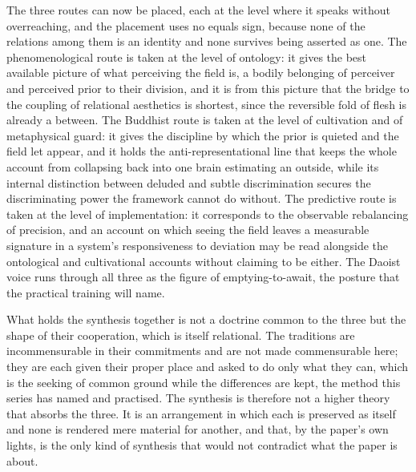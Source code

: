 The three routes can now be placed, each at the level where it speaks without overreaching, and the placement uses no equals sign, because none of the relations among them is an identity and none survives being asserted as one. The phenomenological route is taken at the level of ontology: it gives the best available picture of what perceiving the field is, a bodily belonging of perceiver and perceived prior to their division, and it is from this picture that the bridge to the coupling of relational aesthetics is shortest, since the reversible fold of flesh is already a between. The Buddhist route is taken at the level of cultivation and of metaphysical guard: it gives the discipline by which the prior is quieted and the field let appear, and it holds the anti-representational line that keeps the whole account from collapsing back into one brain estimating an outside, while its internal distinction between deluded and subtle discrimination secures the discriminating power the framework cannot do without. The predictive route is taken at the level of implementation: it corresponds to the observable rebalancing of precision, and an account on which seeing the field leaves a measurable signature in a system's responsiveness to deviation may be read alongside the ontological and cultivational accounts without claiming to be either. The Daoist voice runs through all three as the figure of emptying-to-await, the posture that the practical training will name.

What holds the synthesis together is not a doctrine common to the three but the shape of their cooperation, which is itself relational. The traditions are incommensurable in their commitments and are not made commensurable here; they are each given their proper place and asked to do only what they can, which is the seeking of common ground while the differences are kept, the method this series has named and practised. The synthesis is therefore not a higher theory that absorbs the three. It is an arrangement in which each is preserved as itself and none is rendered mere material for another, and that, by the paper's own lights, is the only kind of synthesis that would not contradict what the paper is about.

